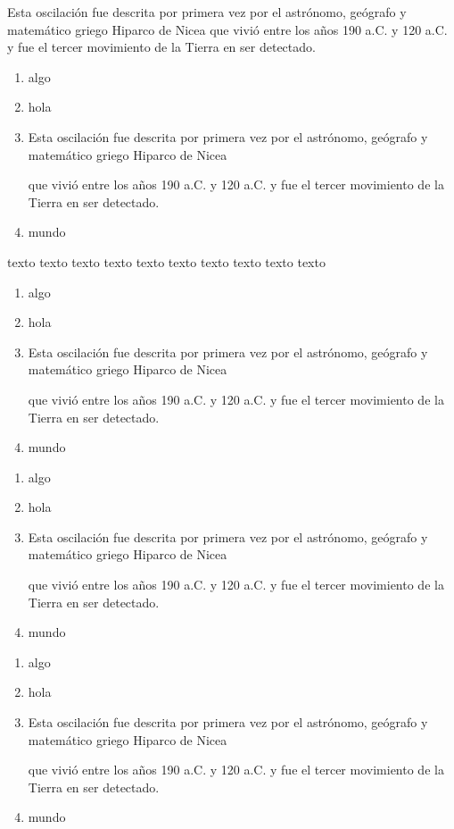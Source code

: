 \documentclass{report}
\theoremstyle{definition}
\theoremstyle{remark}
\begin{document}
	
	
	
Esta oscilación fue descrita por primera vez por el astrónomo, geógrafo y matemático griego Hiparco de Nicea 
que vivió entre los años 190 a.C. y 120 a.C. y fue el tercer movimiento de la Tierra en ser detectado.
\begin{enumerate}[topsep=1cm,partopsep=0pt,parsep=0pt,itemsep=0pt]
	\item algo 
	\item hola
	\item Esta oscilación fue descrita por primera vez por el astrónomo, geógrafo y matemático griego Hiparco de Nicea 
	
	que vivió entre los años 190 a.C. y 120 a.C. y fue el tercer movimiento de la Tierra en ser detectado.
	
	\item mundo
	
\end{enumerate}

\noindent texto texto  texto texto texto texto texto texto texto texto

\begin{enumerate}[leftmargin=*]
	\item algo 
	\item hola
	\item Esta oscilación fue descrita por primera vez por el astrónomo, geógrafo y matemático griego Hiparco de Nicea 
	
	que vivió entre los años 190 a.C. y 120 a.C. y fue el tercer movimiento de la Tierra en ser detectado.
	
	\item mundo
	
\end{enumerate}

\begin{enumerate}[labelsep=*]
	\item algo 
	\item hola
	\item Esta oscilación fue descrita por primera vez por el astrónomo, geógrafo y matemático griego Hiparco de Nicea 
	
	que vivió entre los años 190 a.C. y 120 a.C. y fue el tercer movimiento de la Tierra en ser detectado.
	
	\item mundo
	
\end{enumerate}

\begin{enumerate}[label=\Roman*))]
	\item algo 
	\item hola
	\item Esta oscilación fue descrita por primera vez por el astrónomo, geógrafo y matemático griego Hiparco de Nicea 
	
	que vivió entre los años 190 a.C. y 120 a.C. y fue el tercer movimiento de la Tierra en ser detectado.
	
	\item mundo
	
\end{enumerate}
\end{document}
